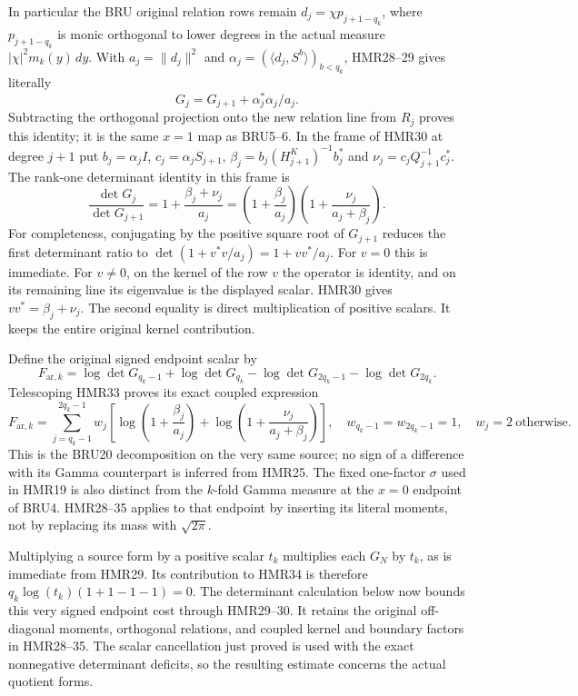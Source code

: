 In particular the BRU original relation rows remain
$d_j=\chi p_{j+1-q_k}$, where $p_{j+1-q_k}$ is
monic orthogonal to lower degrees in the actual
measure $|\chi|^2m_k(y)\,dy$. With
$a_j=\|d_j\|^2$ and
$\alpha_j=(\langle d_j,S^b\rangle)_{b<q_k}$,
HMR28--29 gives literally
\[
 G_j=G_{j+1}+\alpha_j^*\alpha_j/a_j.
 \tag{HMR32}
\]
Subtracting the orthogonal projection onto the
new relation line from $R_j$ proves this identity;
it is the same $x=1$ map as BRU5--6.
In the frame of HMR30 at degree $j+1$ put
$b_j=\alpha_jI$, $c_j=\alpha_jS_{j+1}$,
$\beta_j=b_j(H_{j+1}^K)^{-1}b_j^*$ and
$\nu_j=c_jQ_{j+1}^{-1}c_j^*$.
The rank-one determinant identity in this frame is
\[
 \frac{\det G_j}{\det G_{j+1}}
 =1+\frac{\beta_j+\nu_j}{a_j}
 =\left(1+\frac{\beta_j}{a_j}\right)
   \left(1+\frac{\nu_j}{a_j+\beta_j}\right).
 \tag{HMR33}
\]
For completeness, conjugating by the positive square root
of $G_{j+1}$ reduces the first determinant ratio to
$\det(1+v^*v/a_j)=1+vv^*/a_j$.
For $v=0$ this is immediate. For $v\ne0$,
on the kernel of the row $v$ the operator is identity,
and on its remaining line its eigenvalue is the displayed
scalar. HMR30 gives $vv^*=\beta_j+\nu_j$.
The second equality is direct multiplication of positive
scalars. It keeps the entire original kernel contribution.

Define the original signed endpoint scalar by
\[
 F_{\mathrm{ar},k}
 =\log\det G_{q_k-1}+\log\det G_{q_k}
  -\log\det G_{2q_k-1}-\log\det G_{2q_k}.
 \tag{HMR34}
\]
Telescoping HMR33 proves its exact coupled expression
\[
 F_{\mathrm{ar},k}
 =\sum_{j=q_k-1}^{2q_k-1}w_j
    \left[
      \log\left(1+\frac{\beta_j}{a_j}\right)
      +\log\left(1+\frac{\nu_j}{a_j+\beta_j}\right)
    \right],
 \quad w_{q_k-1}=w_{2q_k-1}=1,\quad w_j=2
 \ \text{otherwise}.
 \tag{HMR35}
\]
This is the BRU20 decomposition on the very same source;
no sign of a difference with its Gamma counterpart is
inferred from HMR25. The fixed one-factor $\sigma$ used
in HMR19 is also distinct from the $k$-fold Gamma measure
at the $x=0$ endpoint of BRU4. HMR28--35 applies to
that endpoint by inserting its literal moments, not
by replacing its mass with $\sqrt{2\pi}$.

Multiplying a source form by a positive scalar $t_k$
multiplies each $G_N$ by $t_k$, as is immediate from
HMR29. Its contribution to HMR34 is therefore
$q_k\log(t_k)(1+1-1-1)=0$.
The determinant calculation below now bounds this very signed
endpoint cost through HMR29--30. It retains the original
off-diagonal moments, orthogonal relations, and coupled kernel
and boundary factors in HMR28--35. The scalar cancellation just
proved is used with the exact nonnegative determinant deficits,
so the resulting estimate concerns the actual quotient forms.

